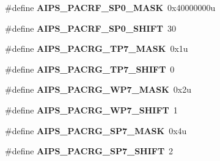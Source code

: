 \begin{DoxyCompactItemize}
\item 
\hypertarget{group___a_i_p_s___register___masks_gae6cf11d6708087f30efedcabc091b67f}{}\#define {\bfseries A\+I\+P\+S\+\_\+\+P\+A\+C\+R\+F\+\_\+\+S\+P0\+\_\+\+M\+A\+S\+K}~0x40000000u\label{group___a_i_p_s___register___masks_gae6cf11d6708087f30efedcabc091b67f}

\item 
\hypertarget{group___a_i_p_s___register___masks_gabe11d5bdab683e0927748a0a96a63197}{}\#define {\bfseries A\+I\+P\+S\+\_\+\+P\+A\+C\+R\+F\+\_\+\+S\+P0\+\_\+\+S\+H\+I\+F\+T}~30\label{group___a_i_p_s___register___masks_gabe11d5bdab683e0927748a0a96a63197}

\item 
\hypertarget{group___a_i_p_s___register___masks_ga31c1a6af89beb1617d51248384fb1b6a}{}\#define {\bfseries A\+I\+P\+S\+\_\+\+P\+A\+C\+R\+G\+\_\+\+T\+P7\+\_\+\+M\+A\+S\+K}~0x1u\label{group___a_i_p_s___register___masks_ga31c1a6af89beb1617d51248384fb1b6a}

\item 
\hypertarget{group___a_i_p_s___register___masks_ga0f772b20c70177238887afcead29852b}{}\#define {\bfseries A\+I\+P\+S\+\_\+\+P\+A\+C\+R\+G\+\_\+\+T\+P7\+\_\+\+S\+H\+I\+F\+T}~0\label{group___a_i_p_s___register___masks_ga0f772b20c70177238887afcead29852b}

\item 
\hypertarget{group___a_i_p_s___register___masks_ga73a957313268ed8b9d3cc631be94bf3e}{}\#define {\bfseries A\+I\+P\+S\+\_\+\+P\+A\+C\+R\+G\+\_\+\+W\+P7\+\_\+\+M\+A\+S\+K}~0x2u\label{group___a_i_p_s___register___masks_ga73a957313268ed8b9d3cc631be94bf3e}

\item 
\hypertarget{group___a_i_p_s___register___masks_ga636f5902da8b5ed2438cfad42cec3a9d}{}\#define {\bfseries A\+I\+P\+S\+\_\+\+P\+A\+C\+R\+G\+\_\+\+W\+P7\+\_\+\+S\+H\+I\+F\+T}~1\label{group___a_i_p_s___register___masks_ga636f5902da8b5ed2438cfad42cec3a9d}

\item 
\hypertarget{group___a_i_p_s___register___masks_ga0c81242b85b708f8f5c235b1b2be70e9}{}\#define {\bfseries A\+I\+P\+S\+\_\+\+P\+A\+C\+R\+G\+\_\+\+S\+P7\+\_\+\+M\+A\+S\+K}~0x4u\label{group___a_i_p_s___register___masks_ga0c81242b85b708f8f5c235b1b2be70e9}

\item 
\hypertarget{group___a_i_p_s___register___masks_ga7c8e3f63cbb70686a1ab226b507ee7fd}{}\#define {\bfseries A\+I\+P\+S\+\_\+\+P\+A\+C\+R\+G\+\_\+\+S\+P7\+\_\+\+S\+H\+I\+F\+T}~2\label{group___a_i_p_s___register___masks_ga7c8e3f63cbb70686a1ab226b507ee7fd}


\end{DoxyCompactItemize}
